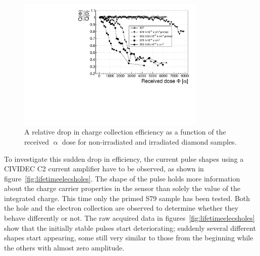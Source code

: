 \begin{figure}[!t]
\begin{center}
\includegraphics[width=0.8\textwidth]{03_measurement_results/scripts/plots/amplvstimecx4}
\caption{A relative drop in charge collection efficiency as a function of the received $\upalpha$ dose for non-irradiated and irradiated diamond samples.}
\label{fig:longtermcx}
\end{center}
\end{figure}

To investigate this sudden drop in efficiency, the current pulse shapes using a CIVIDEC C2 current amplifier have to be observed, as shown in figure~\ref{fig:lifetimeelecsholes}. The shape of the pulse holds more information about the charge carrier properties in the sensor than solely the value of the integrated charge. This time only the primed S79 sample has been tested. Both the hole and the electron collection are observed to determine whether they behave differently or not. The raw acquired data in figures~\ref{fig:lifetimeelecsholes} show that the initially stable pulses start deteriorating; suddenly several different shapes start appearing, some still very similar to those from the beginning while the others with almost zero amplitude. 

